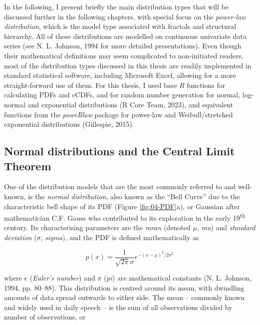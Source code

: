 \documentclass[
  12pt,
]{book}
\begin{document}
In the following, I present briefly the main distribution types that will be discussed further in the following chapters, with special focus on the \emph{power-law distribution}, which is the model type associated with fractals and structural hierarchy. All of these distributions are modelled on continuous univariate data series (see N. L. Johnson, 1994 for more detailed presentations). Even though their mathematical definitions may seem complicated to non-initiated readers, most of the distribution types discussed in this thesis are readily implemented in standard statistical software, including Microsoft Excel, allowing for a more straight-forward use of them. For this thesis, I used base \emph{R} functions for calculating PDFs and cCDFs, and for random number generation for normal, log-normal and exponential distributions (R Core Team, 2023), and equivalent functions from the \emph{poweRlaw} package for power-law and Weibull/stretched exponential distributions (Gillespie, 2015).

\FloatBarrier

\hypertarget{normal-dist}{%
\subsection{Normal distributions and the Central Limit Theorem}\label{normal-dist}}

One of the distribution models that are the most commonly referred to and well-known, is the \emph{normal distribution}, also known as the ``Bell Curve'' due to the characteristic bell shape of its PDF (Figure \ref{fig:04-PDF}a), or Gaussian after mathematician C.F. Gauss who contributed to its exploration in the early 19\textsuperscript{th} century. Its characterising parameters are the \emph{mean} (denoted \(\mu\), \emph{mu}) and \emph{standard deviation} (\(\sigma\), \emph{sigma}), and the PDF is defined mathematically as

\begin{equation}
p(x)=\frac{1}{\sqrt{2\pi}\sigma}e^{-(x-\mu)^2/2\sigma^2}
\label{eq:normal}
\end{equation}

where \(e\) (\emph{Euler's number}) and \(\pi\) (\emph{pi}) are mathematical constants (N. L. Johnson, 1994, pp. 80--88). This distribution is centred around its mean, with dwindling amounts of data spread outwards to either side. The mean -- commonly known and widely used in daily speech -- is the sum of all observations divided by number of observations, or
\end{document}
